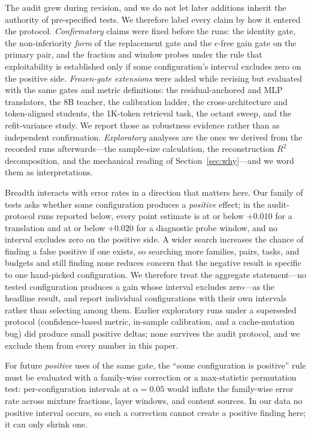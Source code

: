 \documentclass{article} %
\begin{document}
The audit grew during revision, and we do not let later additions inherit the
authority of pre-specified tests. We therefore label every claim by how it
entered the protocol. \emph{Confirmatory} claims were fixed before the runs: the
identity gate, the non-inferiority \emph{form} of the replacement gate and the $\epsilon$-free gain
gate on the primary pair, and the fraction and window probes under the rule that
exploitability is established only if some configuration's interval excludes
zero on the positive side. \emph{Frozen-gate extensions} were added while
revising but evaluated with the same gates and metric definitions: the
residual-anchored and MLP translators, the 8B teacher, the calibration ladder,
the cross-architecture and token-aligned students, the 1K-token retrieval task, the
octant sweep, and the refit-variance study. We report those as robustness
evidence rather than as independent confirmation. \emph{Exploratory} analyses
are the ones we derived from the recorded runs afterwards---the sample-size
calculation, the reconstruction $R^2$ decomposition, and the mechanical reading
of Section~\ref{sec:why}---and we word them as interpretations.

Breadth interacts with error rates in a direction that matters here. Our family
of tests asks whether some configuration produces a \emph{positive} effect; in
the audit-protocol runs reported below, every point estimate is at or below
$+0.010$ for a translation and at or below $+0.020$ for a diagnostic probe
window, and no interval excludes zero on the positive side. A wider search
increases the chance of finding a false positive if one exists, so searching
more families, pairs, tasks, and budgets and still finding none reduces concern that the negative result is specific to one hand-picked configuration. We therefore treat the aggregate statement---no
tested configuration produces a gain whose interval excludes zero---as the
headline result, and report individual configurations with their own intervals
rather than selecting among them. Earlier exploratory runs under a superseded
protocol (confidence-based metric, in-sample calibration, and a cache-mutation
bug) did produce small positive deltas; none survives the audit protocol, and
we exclude them from every number in this paper.

For future \emph{positive} uses of the same gate, the ``some configuration is
positive'' rule must be evaluated with a family-wise correction or a
max-statistic permutation test: per-configuration intervals at
$\alpha{=}0.05$ would inflate the family-wise error rate across mixture
fractions, layer windows, and content sources. In our data no positive interval
occurs, so such a correction cannot create a positive finding here; it can only
shrink one.
\end{document}
